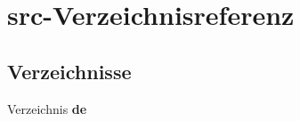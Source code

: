 \section{src-\/\-Verzeichnisreferenz}
\label{dir_b1e8dd2542c76b0878592a1a6870123d}
\subsection*{Verzeichnisse}
\begin{DoxyCompactItemize}
\item 
Verzeichnis {\bf de}
\end{DoxyCompactItemize}
